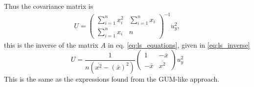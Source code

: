 Thus the covariance matrix is 
\begin{eqnarray*}
 U = \left(
 \begin{array}{cc}
  \sum_{i=1}^n x_i^2 & \sum_{i=1}^n x_i \\
  \sum_{i=1}^n x_i & n
 \end{array}
\right)^{-1} u_y^2,
\end{eqnarray*}
this is the inverse of the matrix $A$ in eq. \eqref{eq:ls_equations}, given in \eqref{eq:ls_inverse}
\begin{equation}
 U = \frac1{n ( \overline{x^2} - (\bar x)^2)}\left( \begin{array}{cc}
                                                       1  & - \bar x \\
                                                       - \bar x &  \overline{x^2}
                                                      \end{array}
                                                      \right) u_y^2
\end{equation}
This is the same as the expressions found from the GUM-like approach.
